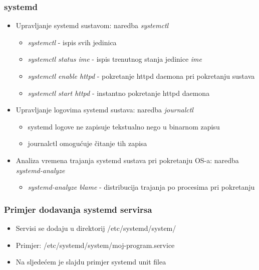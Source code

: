 \documentclass[t]{beamer}
\begin{document}
\begin{frame}
	\frametitle{systemd}
	\begin{itemize}
		\item Upravljanje systemd sustavom: naredba \textit{systemctl}
			\begin{itemize}
				\item \textit{systemctl} - ispis svih jedinica
				\item \textit{systemctl status ime} - ispis trenutnog stanja jedinice \textit{ime}
				\item \textit{systemctl enable httpd} - pokretanje httpd daemona pri pokretanju sustava
				\item \textit{systemctl start httpd} - instantno pokretanje httpd daemona
			\end{itemize}
		\item Upravljanje logovima systemd sustava: naredba \textit{journalctl}
			\begin{itemize}
				\item systemd logove ne zapisuje tekstualno nego u binarnom zapisu
				\item journalctl omogućuje čitanje tih zapisa
			\end{itemize}
		\item Analiza vremena trajanja systemd sustava pri pokretanju OS-a: naredba \textit{systemd-analyze}
			\begin{itemize}
				\item \textit{systemd-analyze blame} - distribucija trajanja po procesima pri pokretanju
			\end{itemize}
		
	\end{itemize}
\end{frame}

\begin{frame}
	\frametitle{Primjer dodavanja systemd servirsa}
	\begin{itemize}
		\item Servisi se dodaju u direktorij /etc/systemd/system/
		\item Primjer: /etc/systemd/system/moj-program.service
		\item Na sljedećem je slajdu primjer systemd unit filea
	\end{itemize}
\end{frame}
\end{document}
